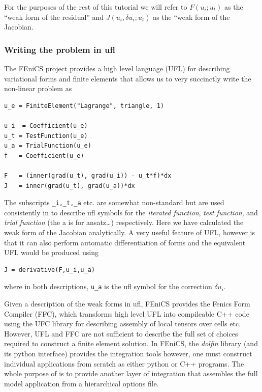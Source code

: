 \documentclass[10pt,twoside,openright]{memoir}
\begin{document}
For the purposes of the rest of this tutorial we will refer to
$F(u_{i};u_{t})$ as the ``weak form of the residual'' and
$J(u_{i},\delta u_{i};u_{t})$ as the ``weak form of the Jacobian.

\subsubsection{Writing the problem in ufl}
\label{sec:writing-problem-ufl}

The FEniCS project provides a  high level language (UFL) for describing
variational forms and finite elements that allows us to very succinctly write the
non-linear problem  as 
\begin{lstlisting}[style=UFL]
u_e = FiniteElement("Lagrange", triangle, 1)

u_i  = Coefficient(u_e)
u_t = TestFunction(u_e)
u_a = TrialFunction(u_e)
f   = Coefficient(u_e)

F   = (inner(grad(u_t), grad(u_i)) - u_t*f)*dx
J   = inner(grad(u_t), grad(u_a))*dx
\end{lstlisting}
The subscripts \texttt{\_i,\_t,\_a} etc. are somewhat non-standard but
are used consistently in \TF{} to describe ufl symbols for the
\emph{iterated function}, \emph{test function}, and \emph{trial
  function} (the a is for ansatz\ldots{}) respectively.  Here we have
calculated the weak form of the Jacobian analytically. A very useful
feature of UFL, however is that it can also perform automatic
differentiation of forms and the equivalent UFL would be produced
using
\begin{lstlisting}[style=UFL]
J = derivative(F,u_i,u_a)
\end{lstlisting}
where in both descriptions, \texttt{u\_a} is the ufl symbol for the
correction $\delta u_{i}$.  

Given a description of the weak forms in ufl,  FEniCS provides the
Fenics Form Compiler (FFC), which transforms high level UFL into
compileable C++ code using the UFC library for describing assembly of
local tensors over cells etc.  However, UFL and FFC are not sufficient
to describe the full set of choices required to construct a finite
element solution.  In FEniCS,  the \emph{dolfin} library (and its
python interface) provides the integration tools however, one must
construct individual applications from scratch as either python or C++
programs.  The whole purpose of \TF{} is to provide another layer of
integration that assembles the full model application from a
hierarchical options file. 
\end{document}
